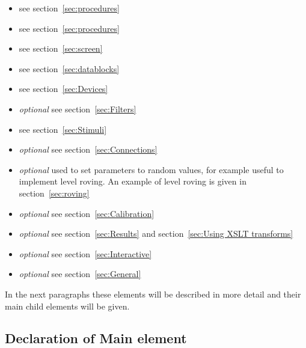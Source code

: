 \begin{itemize}
\item {} see section~\ref{sec:procedures}

\item {} see section~\ref{sec:procedures}

\item {} see section~\ref{sec:screen}

\item {} see section~\ref{sec:datablocks}

\item {} see section~\ref{sec:Devices}

\item {} \emph{optional} see
section~\ref{sec:Filters}

\item {} see section~\ref{sec:Stimuli}

\item {} \emph{optional} see
section~\ref{sec:Connections}

\item {} \emph{optional} used to set
parameters to random values, for example useful to implement level
roving. An example of level roving is given in
section~\ref{sec:roving}

\item {} \emph{optional} see
section~\ref{sec:Calibration}

\item {}\emph{optional} see
section~\ref{sec:Results} and section~\ref{sec:Using XSLT
transforms}


\item {}\emph{optional} see
section~\ref{sec:Interactive}

\item {}\emph{optional} see
section~\ref{sec:General}
\end{itemize}

In the next paragraphs these elements will be described in more
detail and their main child elements will be given.

\subsection{Declaration of Main  element}

